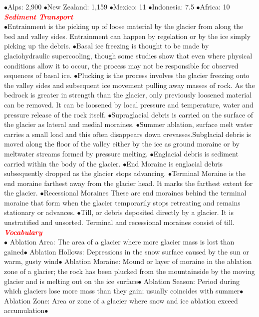 \documentclass{article}
\newcommand{\ddd}{$\bullet$}
\newcommand{\red}[1]{\textcolor{red}{#1}}
\newcommand{\mysection}[1]{\\ \textbf{\textit{\red{#1}}} \\}
\begin{document}
\begin{multicols*}{4}
            \ddd Alps: 2,900
            \ddd New Zealand:	1,159
            \ddd Mexico: 11
            \ddd Indonesia:	7.5
            \ddd Africa: 10
        \mysection{Sediment Transport}
            \ddd Entrainment is the picking up of loose material by the glacier from along the bed and valley sides. Entrainment can happen by regelation or by the ice simply picking up the debris.
            \ddd Basal ice freezing is thought to be made by glaciohydraulic supercooling, though some studies show that even where physical conditions allow it to occur, the process may not be responsible for observed sequences of basal ice.
            \ddd Plucking is the process involves the glacier freezing onto the valley sides and subsequent ice movement pulling away masses of rock. As the bedrock is greater in strength than the glacier, only previously loosened material can be removed. It can be loosened by local pressure and temperature, water and pressure release of the rock itself.
            \ddd Supraglacial debris is carried on the surface of the glacier as lateral and medial moraines.
            \ddd Summer ablation, surface melt water carries a small load and this often disappears down crevasses.Subglacial debris is moved along the floor of the valley either by the ice as ground moraine or by meltwater streams formed by pressure melting.
            \ddd Englacial debris is sediment carried within the body of the glacier.
            \ddd End Moraine is englacial debris subsequently dropped as the glacier stops advancing.
            \ddd Terminal Moraine is the end moraine farthest away from the glacier head. It marks the farthest extent for the glacier.
            \ddd Recessional Moraines These are end moraines behind the terminal moraine that form when the glacier temporarily stops retreating and remains stationary or advances.
            \ddd Till, or debris deposited directly by a glacier. It is unstratified and unsorted. Terminal and recessional moraines consist of till.
        \mysection{Vocabulary} \ddd
        Ablation Area: The area of a glacier where more glacier mass is lost than gained\ddd
        Ablation Hollows: Depressions in the snow surface caused by the sun or warm, gusty wind\ddd
        Ablation Moraine: Mound or layer of moraine in the ablation zone of a glacier; the rock has been plucked from the mountainside by the moving glacier and is melting out on the ice surface\ddd
        Ablation Season: Period during which glaciers lose more mass than they gain; usually coincides with summer\ddd
        Ablation Zone: Area or zone of a glacier where snow and ice ablation exceed accumulation\ddd

\end{multicols*}
\end{document}

